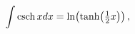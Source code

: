 \[\int\mathop{\mathrm{csch}\/}\nolimits xdx=\mathop{\ln\/}\nolimits\!\left(%
\mathop{\tanh\/}\nolimits\!\left(\tfrac{1}{2}x\right)\right),\]
